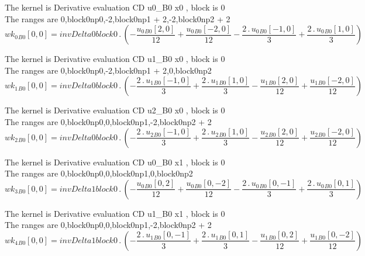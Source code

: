 \documentclass{article}
\begin{document}
\noindent The kernel is Derivative evaluation CD u0_B0 x0 , block is 0\\\noindent The ranges are 0,block0np0,-2,block0np1 + 2,-2,block0np2 + 2\\\begin{dmath}{wk_{0}{_{B0}}}[{0,0}] = invDelta0block0 \,.\, \left(- \frac{{u_{0}{_{B0}}}[{2,0}]}{12} + \frac{{u_{0}{_{B0}}}[{-2,0}]}{12} - \frac{2 \,.\, {u_{0}{_{B0}}}[{-1,0}]}{3} + \frac{2 \,.\, {u_{0}{_{B0}}}[{1,0}]}{3}\right)\end{dmath}

\noindent The kernel is Derivative evaluation CD u1_B0 x0 , block is 0\\\noindent The ranges are 0,block0np0,-2,block0np1 + 2,0,block0np2\\\begin{dmath}{wk_{1}{_{B0}}}[{0,0}] = invDelta0block0 \,.\, \left(- \frac{2 \,.\, {u_{1}{_{B0}}}[{-1,0}]}{3} + \frac{2 \,.\, {u_{1}{_{B0}}}[{1,0}]}{3} - \frac{{u_{1}{_{B0}}}[{2,0}]}{12} + \frac{{u_{1}{_{B0}}}[{-2,0}]}{12}\right)\end{dmath}

\noindent The kernel is Derivative evaluation CD u2_B0 x0 , block is 0\\\noindent The ranges are 0,block0np0,0,block0np1,-2,block0np2 + 2\\\begin{dmath}{wk_{2}{_{B0}}}[{0,0}] = invDelta0block0 \,.\, \left(- \frac{2 \,.\, {u_{2}{_{B0}}}[{-1,0}]}{3} + \frac{2 \,.\, {u_{2}{_{B0}}}[{1,0}]}{3} - \frac{{u_{2}{_{B0}}}[{2,0}]}{12} + \frac{{u_{2}{_{B0}}}[{-2,0}]}{12}\right)\end{dmath}

\noindent The kernel is Derivative evaluation CD u0_B0 x1 , block is 0\\\noindent The ranges are 0,block0np0,0,block0np1,0,block0np2\\\begin{dmath}{wk_{3}{_{B0}}}[{0,0}] = invDelta1block0 \,.\, \left(- \frac{{u_{0}{_{B0}}}[{0,2}]}{12} + \frac{{u_{0}{_{B0}}}[{0,-2}]}{12} - \frac{2 \,.\, {u_{0}{_{B0}}}[{0,-1}]}{3} + \frac{2 \,.\, {u_{0}{_{B0}}}[{0,1}]}{3}\right)\end{dmath}

\noindent The kernel is Derivative evaluation CD u1_B0 x1 , block is 0\\\noindent The ranges are 0,block0np0,0,block0np1,-2,block0np2 + 2\\\begin{dmath}{wk_{4}{_{B0}}}[{0,0}] = invDelta1block0 \,.\, \left(- \frac{2 \,.\, {u_{1}{_{B0}}}[{0,-1}]}{3} + \frac{2 \,.\, {u_{1}{_{B0}}}[{0,1}]}{3} - \frac{{u_{1}{_{B0}}}[{0,2}]}{12} + \frac{{u_{1}{_{B0}}}[{0,-2}]}{12}\right)\end{dmath}
\end{document}
